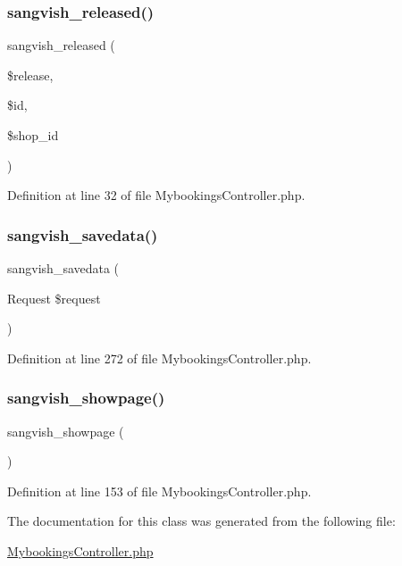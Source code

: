 \subsubsection{\texorpdfstring{sangvish\_released()}{sangvish\_released()}}
{\footnotesize\ttfamily sangvish\+\_\+released (\begin{DoxyParamCaption}\item[{}]{\$release,  }\item[{}]{\$id,  }\item[{}]{\$shop\+\_\+id }\end{DoxyParamCaption})}



Definition at line 32 of file Mybookings\+Controller.\+php.

\mbox{\label{class_responsive_1_1_http_1_1_controllers_1_1_mybookings_controller_a63d8d498a130e9f530dd9de0247a0c74}} 
\subsubsection{\texorpdfstring{sangvish\_savedata()}{sangvish\_savedata()}}
{\footnotesize\ttfamily sangvish\+\_\+savedata (\begin{DoxyParamCaption}\item[{Request}]{\$request }\end{DoxyParamCaption})}



Definition at line 272 of file Mybookings\+Controller.\+php.

\mbox{\label{class_responsive_1_1_http_1_1_controllers_1_1_mybookings_controller_ae5a8b5289e68974315c61e6e9f0e6494}} 
\subsubsection{\texorpdfstring{sangvish\_showpage()}{sangvish\_showpage()}}
{\footnotesize\ttfamily sangvish\+\_\+showpage (\begin{DoxyParamCaption}{ }\end{DoxyParamCaption})}



Definition at line 153 of file Mybookings\+Controller.\+php.



The documentation for this class was generated from the following file\+:\begin{DoxyCompactItemize}
\item 
\mbox{\hyperlink{_mybookings_controller_8php}{Mybookings\+Controller.\+php}}\end{DoxyCompactItemize}

